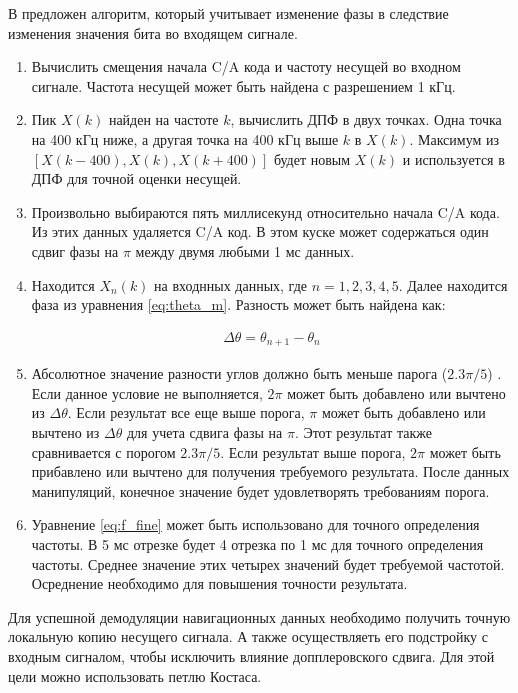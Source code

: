 В \cite{tsui} предложен алгоритм, который учитывает изменение фазы в следствие изменения значения бита во входящем сигнале.
\begin{enumerate}
\renewcommand{\labelenumi}{\arabic{enumi}.}
    \item Вычислить смещения начала C/A кода и частоту несущей во входном сигнале. Частота несущей может быть найдена с разрешением 1 кГц.
    \item Пик ${X(k)}$ найден на частоте ${k}$, вычислить ДПФ в двух точках. Одна точка на 400 кГц ниже, а другая точка на 400 кГц выше ${k}$ в ${X(k)}$.
    	  Максимум из ${[X(k-400), X(k), X(k+400)]}$ будет новым ${X(k)}$ и используется в ДПФ для точной оценки несущей.
    \item Произвольно выбираются пять миллисекунд относительно начала C/A кода. Из этих данных удаляется C/A код. В этом куске может
          содержаться один сдвиг фазы на ${\pi}$ между двумя любыми 1 мс данных.
    \item Находится ${X_n(k)}$ на входнных данных, где ${n = 1, 2, 3, 4, 5}$. Далее находится фаза из уравнения \ref{eq:theta_m}. Разность может
          быть найдена как:

	\begin{eqnarray}
	\Delta{\theta} = \theta_{n+1} - \theta_n
	\label{eq:Delta_phi}
	\end{eqnarray}

    \item Абсолютное значение разности углов должно быть меньше парога (${2.3\pi/5}$) \cite{tsui}. Если данное условие не выполняется, ${2\pi}$
          может быть добавлено или вычтено из ${\Delta{\theta}}$. Если результат все еще выше порога, ${\pi}$ может быть добавлено или вычтено
	  из ${\Delta{\theta}}$ для учета сдвига фазы на ${\pi}$. Этот результат также сравнивается с порогом ${2.3\pi/5}$. Если результат выше
	  порога, ${2\pi}$ может быть прибавлено или вычтено для получения требуемого результата. После данных манипуляций, конечное значение будет
	  удовлетворять требованиям порога.
    \item Уравнение \ref{eq:f_fine} может быть использовано для точного определения частоты. В 5 мс отрезке будет 4 отрезка по 1 мс для точного
          определения частоты. Среднее значение этих четырех значений будет требуемой частотой. Осреднение необходимо для повышения точности результата.
\end{enumerate}


Для успешной демодуляции навигационных данных необходимо получить точную локальную копию несущего сигнала. А
также осуществляеть его подстройку с входным сигналом, чтобы исключить влияние допплеровского сдвига. Для этой 
цели можно использовать петлю Костаса.

